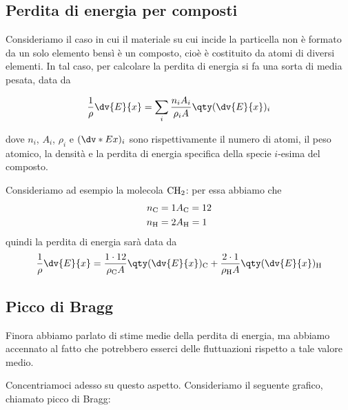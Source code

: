 \subsection{Perdita di energia per composti}

Consideriamo il caso in cui il materiale su cui incide la particella non è formato da un solo elemento bensì è un composto, cioè è costituito da atomi di diversi elementi. In tal caso, per calcolare la perdita di energia si fa una sorta di media pesata, data da

\begin{equation*}
    \frac{1}{\rho} \dv{E}{x}
    =\sum_i \frac{n_i A_i}{\rho_i A} \qty( \dv{E}{x} )_i
\end{equation*}

dove $n_i$, $A_i$, $\rho_i$ e $(\dv*{E}{x})_i$ sono rispettivamente il numero di atomi, il peso atomico, la densità e la perdita di energia specifica della specie $i$-esima del composto.

Consideriamo ad esempio la molecola $\rm CH_2$: per essa abbiamo che
\begin{eqnarray*}
    n_{\rm C}=1 & A_{\rm C}=12\\
    n_{\rm H}=2 & A_{\rm H}=1
\end{eqnarray*}
quindi la perdita di energia sarà data da
\begin{equation*}
    \frac{1}{\rho} \dv{E}{x}
    =\frac{1 \cdot 12}{\rho_{\rm C} A} \qty( \dv{E}{x} )_{\rm C} + \frac{2 \cdot 1}{\rho_{\rm H} A} \qty( \dv{E}{x} )_{\rm H}
\end{equation*}

\subsection{Picco di Bragg}

Finora abbiamo parlato di stime medie della perdita di energia, ma abbiamo accennato al fatto che potrebbero esserci delle fluttuazioni rispetto a tale valore medio.

Concentriamoci adesso su questo aspetto. Consideriamo il seguente grafico, chiamato picco di Bragg:

